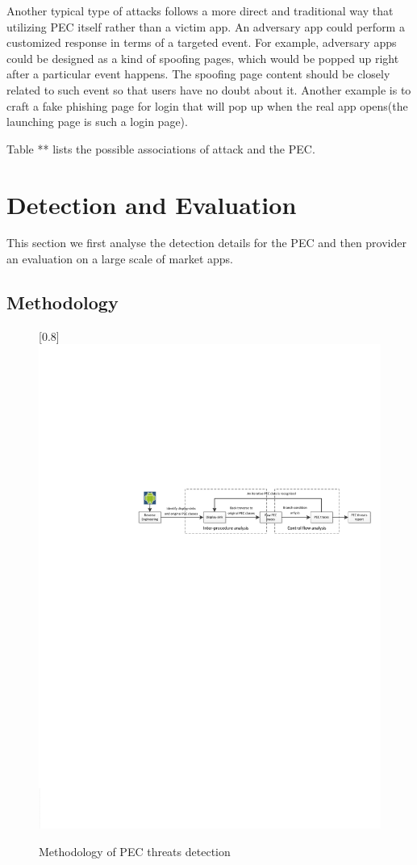 \documentclass{sig-alternate-05-2015}
\begin{document}
Another typical type of attacks follows a more direct and traditional way that utilizing PEC itself rather than a victim app. An adversary app could perform a customized response in terms of a targeted event. For example, adversary apps could be designed as a kind of spoofing pages, which would be popped up right after a particular event happens. The spoofing page content should be closely related to such event so that users have no doubt about it. Another example is to craft a fake phishing page for login that will pop up when the real app opens(the launching page is such a login page).

Table ** lists the possible associations of attack and the PEC.


\section{Detection and Evaluation}
This section we first analyse the detection details for the PEC and then provider an evaluation on a large scale of market apps.
\subsection{Methodology}



\begin{figure}[t]
\centering
\scalebox{1}[0.8]{\includegraphics{detection_flow.pdf}}
\caption{\label{} Methodology of PEC threats detection}
\end{figure}
\end{document}

